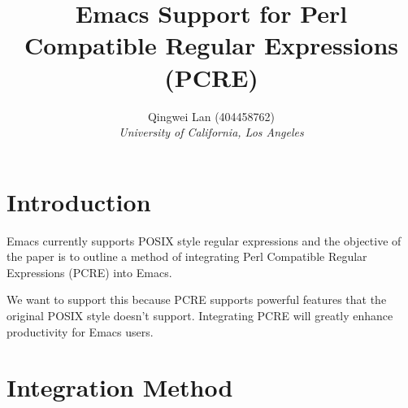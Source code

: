 \documentclass[12pt]{article}
\begin{document}
\title{Emacs Support for Perl Compatible Regular Expressions (PCRE)}
\author{Qingwei Lan (404458762)\\ \textit{University of California, Los Angeles}}
\maketitle



\section{Introduction}

Emacs currently supports POSIX style regular expressions and the objective of the paper is to outline a method of integrating Perl Compatible Regular Expressions (PCRE) into Emacs.

We want to support this because PCRE supports powerful features that the original POSIX style doesn't support. Integrating PCRE will greatly enhance productivity for Emacs users.



\section{Integration Method}
\end{document}
